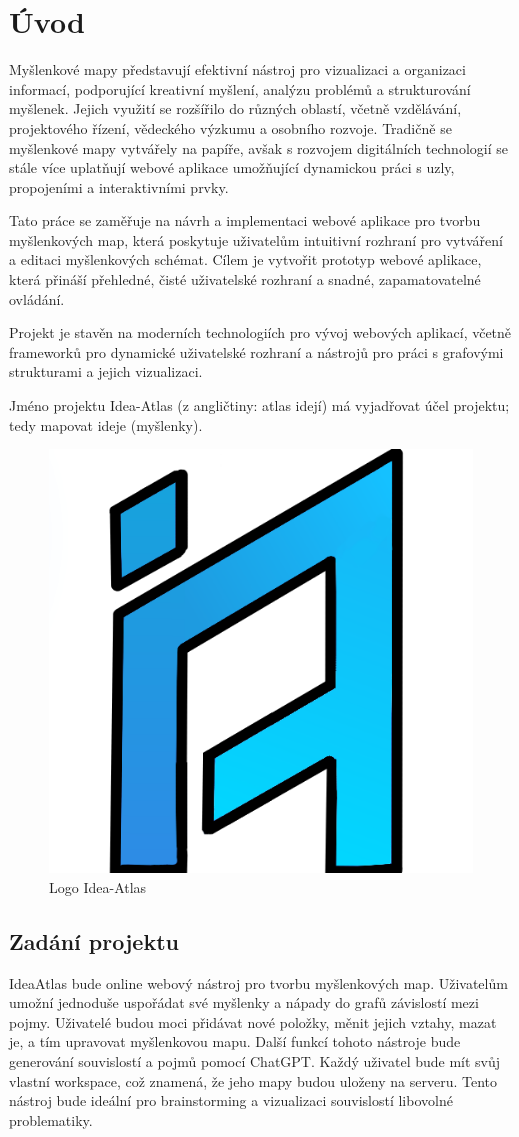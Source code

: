 \section{Úvod}
Myšlenkové mapy představují efektivní nástroj pro vizualizaci a organizaci informací, podporující kreativní myšlení, analýzu problémů a strukturování myšlenek. Jejich využití se rozšířilo do různých oblastí, včetně vzdělávání, projektového řízení, vědeckého výzkumu a osobního rozvoje. Tradičně se myšlenkové mapy vytvářely na papíře, avšak s rozvojem digitálních technologií se stále více uplatňují webové aplikace umožňující dynamickou práci s uzly, propojeními a interaktivními prvky.
\newline

Tato práce se zaměřuje na návrh a implementaci webové aplikace pro tvorbu myšlenkových map, která poskytuje uživatelům intuitivní rozhraní pro vytváření a editaci myšlenkových schémat. Cílem je vytvořit prototyp webové aplikace, která přináší přehledné, čisté uživatelské rozhraní a snadné, zapamatovatelné ovládání.
\newline

Projekt je stavěn na moderních  technologiích pro vývoj webových aplikací, včetně frameworků pro dynamické uživatelské rozhraní a nástrojů pro práci s grafovými strukturami a jejich vizualizaci.
\newline

Jméno projektu Idea-Atlas (z angličtiny: atlas idejí) má vyjadřovat účel projektu; tedy mapovat ideje (myšlenky).

\begin{figure}[h]
    \centering
    \includegraphics[width=0.3\linewidth]{Images/Logo.png}
    \caption{Logo Idea-Atlas}
\end{figure}
\newpage
\subsection{Zadání projektu}
IdeaAtlas bude online webový nástroj pro tvorbu myšlenkových map. Uživatelům umožní jednoduše uspořádat své myšlenky a nápady do grafů závislostí mezi pojmy. Uživatelé budou moci přidávat nové položky, měnit jejich vztahy, mazat je, a tím upravovat myšlenkovou mapu. Další funkcí tohoto nástroje bude generování souvislostí a pojmů pomocí ChatGPT. Každý uživatel bude mít svůj vlastní workspace, což znamená, že jeho mapy budou uloženy na serveru. Tento nástroj bude ideální pro brainstorming a vizualizaci souvislostí libovolné problematiky.
